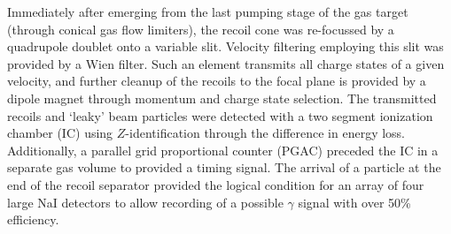 Immediately after emerging from the last pumping stage of the gas target (through conical gas flow limiters), the recoil cone was re-focussed by a quadrupole doublet onto a variable slit. Velocity filtering employing this slit was provided by a Wien filter. Such an element transmits all charge states of a given velocity, and further cleanup of the recoils to the focal plane is provided by a dipole magnet through momentum and charge state selection. The transmitted recoils and `leaky' beam particles were detected with a two segment ionization chamber (IC) using $Z$-identification through the difference in energy loss. Additionally, a parallel grid proportional counter (PGAC) preceded the IC in a separate gas volume to provided a timing signal. The arrival of a particle at the end of the recoil separator provided the logical condition for an array of four large NaI detectors to allow recording of a possible $\gamma$ signal with over 50\% efficiency.

